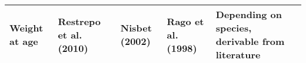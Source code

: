 \documentclass[]{article}
\begin{document}
\begin{longtable}[]{@{}lllll@{}}
\begin{minipage}[t]{0.17\columnwidth}
Weight at age\strut
\end{minipage} & \begin{minipage}[t]{0.17\columnwidth}\raggedright\strut
Restrepo et al. (2010)\strut
\end{minipage} & \begin{minipage}[t]{0.17\columnwidth}\raggedright\strut
Nisbet (2002)\strut
\end{minipage} & \begin{minipage}[t]{0.17\columnwidth}\raggedright\strut
Rago et al. (1998)\strut
\end{minipage} & \begin{minipage}[t]{0.17\columnwidth}\raggedright\strut
Depending on species, derivable from literature\strut
\end{minipage}\tabularnewline
\bottomrule
\end{longtable}

\newpage
\end{document}
